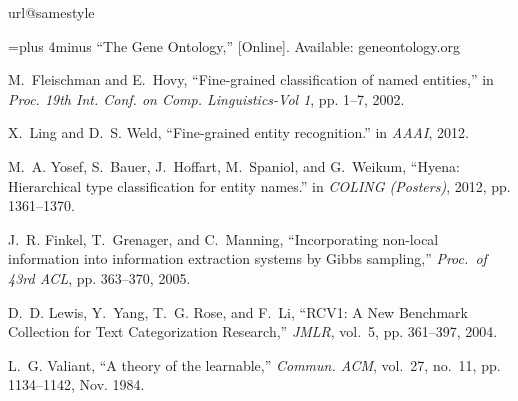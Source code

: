 \documentclass[10pt,conference,compsocconf]{IEEEtran}
\begin{document}
% 


\begin{small}
\begin{thebibliography}{10}
\providecommand{\url}[1]{#1}
\csname url@samestyle\endcsname
\providecommand{\newblock}{\relax}
\providecommand{\bibinfo}[2]{#2}
\providecommand{\BIBentrySTDinterwordspacing}{\spaceskip=0pt\relax}
\providecommand{\BIBentryALTinterwordstretchfactor}{4}
\providecommand{\BIBentryALTinterwordspacing}{\spaceskip=\fontdimen2\font plus
\BIBentryALTinterwordstretchfactor\fontdimen3\font minus
  \fontdimen4\font\relax}
\providecommand{\BIBforeignlanguage}[2]{{%
\expandafter\ifx\csname l@#1\endcsname\relax
\typeout{** WARNING: IEEEtran.bst: No hyphenation pattern has been}%
\typeout{** loaded for the language `#1'. Using the pattern for}%
\typeout{** the default language instead.}%
\else
\language=\csname l@#1\endcsname
\fi
#2}}
\providecommand{\BIBdecl}{\relax}
\BIBdecl

\BIBentryALTinterwordspacing
``The {Gene} {Ontology},'' [Online]. Available:
  \url{geneontology.org}
\BIBentrySTDinterwordspacing

M.~Fleischman and E.~Hovy, ``Fine-grained classification of named entities,''
  in \emph{Proc. 19th Int. Conf. on Comp.
  Linguistics-Vol 1}, pp. 1--7,  2002. 

X.~Ling and D.~S. Weld, ``Fine-grained entity recognition.'' in \emph{AAAI},
  2012.

M.~A. Yosef, S.~Bauer, J.~Hoffart, M.~Spaniol, and G.~Weikum, ``Hyena:
  Hierarchical type classification for entity names.'' in \emph{COLING
  (Posters)}, 2012, pp. 1361--1370.

J.~R. Finkel, T.~Grenager, and C.~Manning, ``Incorporating non-local
  information into information extraction systems by Gibbs sampling,'' 
  \emph{Proc.~of 43rd ACL}, pp. 363--370, 2005.

D.~D. Lewis, Y.~Yang, T.~G. Rose, and F.~Li, ``{RCV1: A New Benchmark
  Collection for Text Categorization Research},'' \emph{JMLR},
  vol.~5, pp. 361--397, 2004.

L.~G. Valiant, ``A theory of the learnable,'' \emph{Commun. ACM}, vol.~27,
  no.~11, pp. 1134--1142, Nov. 1984.


\end{thebibliography}
\end{small}
\end{document}
